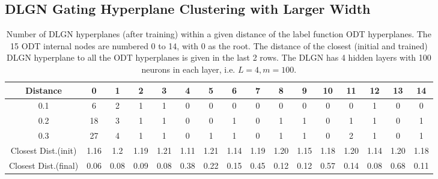 \documentclass{article} %
\renewcommand{\>}{{\rightarrow}}
\renewcommand{\=}{\stackrel{\triangle}{=}}
\newcommand{\0}{{\mathbf 0}}
\begin{document}
\subsection{DLGN Gating Hyperplane Clustering with Larger Width}
\begin{table}[h]
\caption{Number of DLGN hyperplanes (after training) within a given distance of the label function ODT hyperplanes. The 15 ODT internal nodes are numbered 0 to 14, with 0 as the root. The distance of the closest (initial and trained) DLGN hyperplane to all the ODT hyperplanes is given in the last 2 rows. The DLGN has 4 hidden layers with 100 neurons in each layer, i.e. $L=4, m=100$.}

\label{tab:Distance table SD2 for DLGN 100}
\begin{center}
\begin{adjustbox}{width=1 \textwidth}
\begin{tabular}{|c||c|c|c|c|c|c|c|c|c|c|c|c|c|c|c|} 
\hline
Distance & 0 & 1 & 2 & 3 & 4 & 5 & 6 & 7 & 8 & 9 & 10 & 11 & 12 & 13 & 14 \\ \hline
 0.1        &6 &2 &1 &1 &0 &0 &0 &0 &0 &0 &0 &0 &1 &0 &0\\
 0.2        &18 &3 &1 &1 &0 &0 &1 &0 &1 &1 &0 &1 &1 &0 &1\\
 0.3       &27 &4 &1 &1 &0 &1 &1 &0 &1 &1 &0 &2 &1 &0 &1\\ 
 \hline
 \hline
 Closest Dist.(init) &1.16 &1.2  &1.19 &1.21 &1.11 &1.21 &1.14 &1.19 &1.20 &1.15 &1.18 &1.20 &1.14 &1.20 &1.18\\
 Closest Dist.(final) &0.06 &0.08 &0.09 &0.08 &0.38 &0.22 &0.15 &0.45 &0.12 &0.12 &0.57 &0.14 &0.08 &0.68 &0.11\\
 \hline
\end{tabular}
\end{adjustbox}
\end{center}
\end{table}
\end{document}
